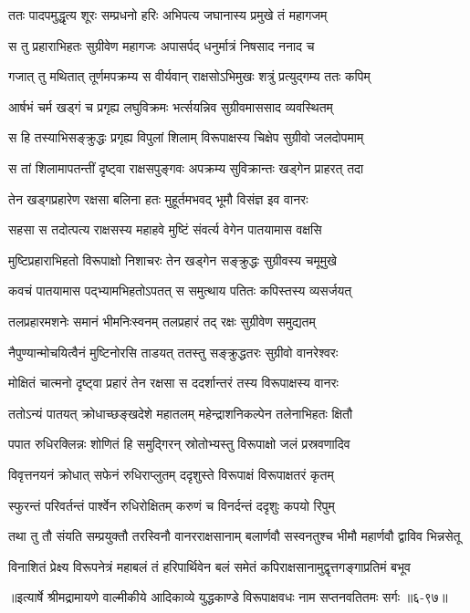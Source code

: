 \twolineshloka
{ततः पादपमुद्धृत्य शूरः सम्प्रधनो हरिः}
{अभिपत्य जघानास्य प्रमुखे तं महागजम्} %

\twolineshloka
{स तु प्रहाराभिहतः सुग्रीवेण महागजः}
{अपासर्पद् धनुर्मात्रं निषसाद ननाद च} %

\twolineshloka
{गजात् तु मथितात् तूर्णमपक्रम्य स वीर्यवान्}
{राक्षसोऽभिमुखः शत्रुं प्रत्युद्गम्य ततः कपिम्} %

\twolineshloka
{आर्षभं चर्म खड्गं च प्रगृह्य लघुविक्रमः}
{भर्त्सयन्निव सुग्रीवमाससाद व्यवस्थितम्} %

\twolineshloka
{स हि तस्याभिसङ्क्रुद्धः प्रगृह्य विपुलां शिलाम्}
{विरूपाक्षस्य चिक्षेप सुग्रीवो जलदोपमाम्} %

\twolineshloka
{स तां शिलामापतन्तीं दृष्ट्वा राक्षसपुङ्गवः}
{अपक्रम्य सुविक्रान्तः खड्गेन प्राहरत् तदा} %

\twolineshloka
{तेन खड्गप्रहारेण रक्षसा बलिना हतः}
{मुहूर्तमभवद् भूमौ विसंज्ञ इव वानरः} %

\twolineshloka
{सहसा स तदोत्पत्य राक्षसस्य महाहवे}
{मुष्टिं संवर्त्य वेगेन पातयामास वक्षसि} %

\twolineshloka
{मुष्टिप्रहाराभिहतो विरूपाक्षो निशाचरः}
{तेन खड्गेन सङ्क्रुद्धः सुग्रीवस्य चमूमुखे} %

\twolineshloka
{कवचं पातयामास पद्भ्यामभिहतोऽपतत्}
{स समुत्थाय पतितः कपिस्तस्य व्यसर्जयत्} %

\twolineshloka
{तलप्रहारमशनेः समानं भीमनिःस्वनम्}
{तलप्रहारं तद् रक्षः सुग्रीवेण समुद्यतम्} %

\twolineshloka
{नैपुण्यान्मोचयित्वैनं मुष्टिनोरसि ताडयत्}
{ततस्तु सङ्क्रुद्धतरः सुग्रीवो वानरेश्वरः} %

\twolineshloka
{मोक्षितं चात्मनो दृष्ट्वा प्रहारं तेन रक्षसा}
{स ददर्शान्तरं तस्य विरूपाक्षस्य वानरः} %

\twolineshloka
{ततोऽन्यं पातयत् क्रोधाच्छङ्खदेशे महातलम्}
{महेन्द्राशनिकल्पेन तलेनाभिहतः क्षितौ} %

\twolineshloka
{पपात रुधिरक्लिन्नः शोणितं हि समुद्गिरन्}
{स्रोतोभ्यस्तु विरूपाक्षो जलं प्रस्रवणादिव} %

\twolineshloka
{विवृत्तनयनं क्रोधात् सफेनं रुधिराप्लुतम्}
{ददृशुस्ते विरूपाक्षं विरूपाक्षतरं कृतम्} %

\twolineshloka
{स्फुरन्तं परिवर्तन्तं पार्श्वेन रुधिरोक्षितम्}
{करुणं च विनर्दन्तं ददृशुः कपयो रिपुम्} %

\twolineshloka
{तथा तु तौ संयति सम्प्रयुक्तौ तरस्विनौ वानरराक्षसानाम्}
{बलार्णवौ सस्वनतुश्च भीमौ महार्णवौ द्वाविव भिन्नसेतू} %

\twolineshloka
{विनाशितं प्रेक्ष्य विरूपनेत्रं महाबलं तं हरिपार्थिवेन}
{बलं समेतं कपिराक्षसानामुद्वृत्तगङ्गाप्रतिमं बभूव} %


॥इत्यार्षे श्रीमद्रामायणे वाल्मीकीये आदिकाव्ये युद्धकाण्डे विरूपाक्षवधः नाम सप्तनवतितमः सर्गः ॥६-९७॥
